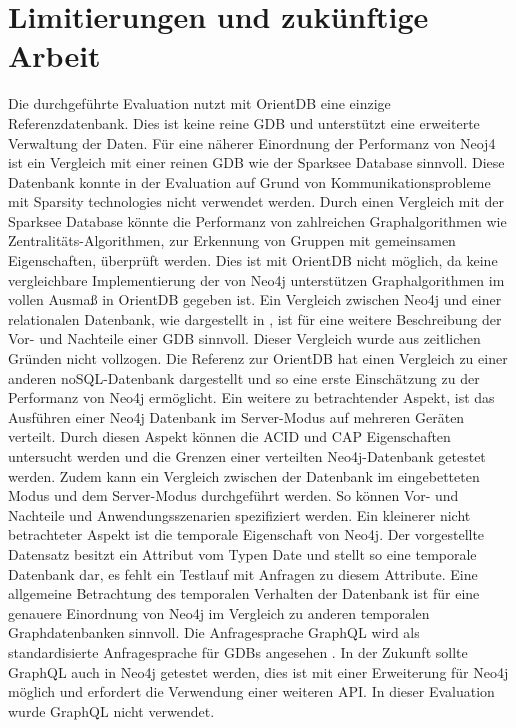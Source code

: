\section{Limitierungen und zukünftige Arbeit}
Die durchgeführte Evaluation nutzt mit OrientDB  eine einzige Referenzdatenbank. Dies ist keine reine GDB und unterstützt eine erweiterte Verwaltung der Daten. Für eine näherer Einordnung der Performanz von Neoj4 ist ein Vergleich mit einer reinen GDB wie der Sparksee Database \parencite{Sparksee} sinnvoll. Diese Datenbank konnte in der Evaluation auf Grund von Kommunikationsprobleme mit Sparsity technologies nicht verwendet werden. Durch einen Vergleich mit der Sparksee Database könnte die Performanz von zahlreichen Graphalgorithmen  wie Zentralitäts-Algorithmen, zur Erkennung von Gruppen mit gemeinsamen Eigenschaften, überprüft werden. Dies ist mit OrientDB nicht möglich, da keine vergleichbare Implementierung der von Neo4j unterstützen Graphalgorithmen im vollen Ausmaß in OrientDB gegeben ist. \newline 
Ein Vergleich zwischen Neo4j und einer relationalen Datenbank, wie dargestellt in \parencite{vicknair2010comparison}, ist für eine weitere Beschreibung der Vor- und Nachteile einer GDB sinnvoll. Dieser Vergleich wurde aus zeitlichen Gründen nicht vollzogen. Die Referenz zur OrientDB hat einen Vergleich zu einer anderen noSQL-Datenbank dargestellt und so eine erste Einschätzung zu der Performanz von Neo4j ermöglicht. \newline
Ein weitere zu betrachtender Aspekt, ist das Ausführen einer Neo4j Datenbank im Server-Modus auf mehreren Geräten verteilt. Durch diesen Aspekt können die ACID und CAP Eigenschaften untersucht werden und die Grenzen einer verteilten Neo4j-Datenbank getestet werden. Zudem kann ein Vergleich zwischen der Datenbank im eingebetteten Modus und dem Server-Modus durchgeführt werden. So können Vor- und Nachteile und  Anwendungsszenarien spezifiziert werden. \newline
Ein kleinerer nicht betrachteter Aspekt ist die temporale Eigenschaft von Neo4j. Der vorgestellte Datensatz besitzt ein Attribut vom Typen Date und stellt so eine temporale Datenbank dar, es fehlt ein Testlauf mit Anfragen zu diesem Attribute. Eine allgemeine Betrachtung des temporalen Verhalten der Datenbank ist für eine genauere Einordnung von Neo4j im Vergleich zu anderen temporalen Graphdatenbanken sinnvoll.   \newline
Die Anfragesprache GraphQL wird als standardisierte Anfragesprache für GDBs angesehen \parencite{GraphQL}. In der Zukunft sollte GraphQL auch in Neo4j getestet werden, dies ist mit einer Erweiterung für Neo4j möglich und erfordert die Verwendung einer weiteren API. In dieser Evaluation wurde GraphQL nicht verwendet. 
